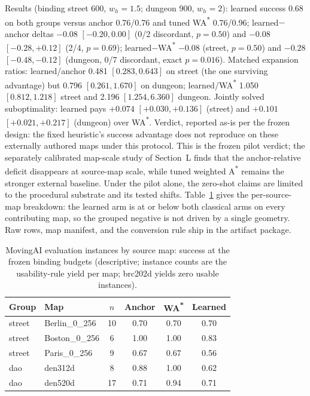 \documentclass[letterpaper]{article} %
\begin{document}
Results (binding street 600, $w_h{=}1.5$; dungeon 900, $w_h{=}2$): learned success 0.68 on both groups versus anchor 0.76/0.76 and tuned WA\textsuperscript{*} 0.76/0.96; learned$-$anchor deltas $-0.08$ $[-0.20, 0.00]$ (0/2 discordant, $p{=}0.50$) and $-0.08$ $[-0.28, +0.12]$ (2/4, $p{=}0.69$); learned$-$WA\textsuperscript{*} $-0.08$ (street, $p{=}0.50$) and $-0.28$ $[-0.48,-0.12]$ (dungeon, 0/7 discordant, exact $p{=}0.016$). Matched expansion ratios: learned/anchor 0.481 $[0.283, 0.643]$ on street (the one surviving advantage) but 0.796 $[0.261, 1.670]$ on dungeon; learned/WA\textsuperscript{*} 1.050 $[0.812, 1.218]$ street and 2.196 $[1.254, 6.360]$ dungeon. Jointly solved suboptimality: learned pays $+0.074$ $[+0.030, +0.136]$ (street) and $+0.101$ $[+0.021, +0.217]$ (dungeon) over WA\textsuperscript{*}. Verdict, reported as-is per the frozen design: the fixed heuristic's success advantage does not reproduce on these externally authored maps under this protocol. This is the frozen pilot verdict; the separately calibrated map-scale study of Section~L finds that the anchor-relative deficit disappears at source-map scale, while tuned weighted A\textsuperscript{*} remains the stronger external baseline. Under the pilot alone, the zero-shot claims are limited to the procedural substrate and its tested shifts. Table~\ref{tab:maimaps} gives the per-source-map breakdown: the learned arm is at or below both classical arms on every contributing map, so the grouped negative is not driven by a single geometry. Raw rows, map manifest, and the conversion rule ship in the artifact package.

\begin{table}[t]
\centering
\small
\setlength{\tabcolsep}{3pt}
\begin{tabular}{@{}llcccc@{}}
\toprule
Group & Map & $n$ & Anchor & WA\textsuperscript{*} & Learned \\
\midrule
street & Berlin\_0\_256 & 10 & 0.70 & 0.70 & 0.70 \\
street & Boston\_0\_256 & 6 & 1.00 & 1.00 & 0.83 \\
street & Paris\_0\_256 & 9 & 0.67 & 0.67 & 0.56 \\
dao & den312d & 8 & 0.88 & 1.00 & 0.62 \\
dao & den520d & 17 & 0.71 & 0.94 & 0.71 \\
\bottomrule
\end{tabular}
\caption{MovingAI evaluation instances by source map: success at the frozen binding budgets (descriptive; instance counts are the usability-rule yield per map; brc202d yields zero usable instances).}
\label{tab:maimaps}
\end{table}
\end{document}
